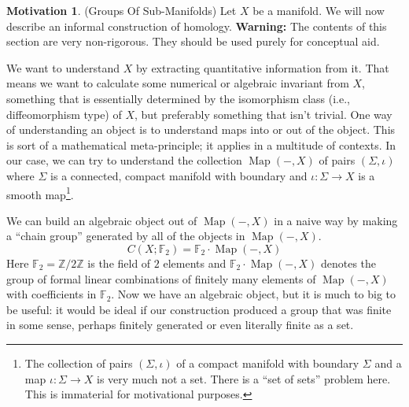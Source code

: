 \documentclass[12pt]{article}
\theoremstyle{definition}
\newtheorem{motivation}[theorem]{Motivation}
\numberwithin{equation}{section}
\newcommand{\Z}{{\mathbb Z}}
\newcommand{\op}{\operatorname}
\begin{document}
\begin{motivation} \label{mot:groups_of_sub_manifolds} (Groups Of Sub-Manifolds) Let $X$ be a manifold. We will now describe an informal construction of homology. {\bf Warning:} The contents of this section are very non-rigorous. They should be used purely for conceptual aid.

We want to understand $X$ by extracting quantitative information from it. That means we want to calculate some numerical or algebraic invariant from $X$, something that is essentially determined by the isomorphism class (i.e., diffeomorphism type) of $X$, but preferably something that isn't trivial. One way of understanding an object is to understand maps into or out of the object. This is sort of a mathematical meta-principle; it applies in a multitude of contexts. In our case, we can try to understand the collection $\op{Map}(-,X)$ of pairs $(\Sigma,\iota)$ where $\Sigma$ is a connected, compact manifold with boundary and $\iota:\Sigma \to X$ is a smooth map\footnote{The collection of pairs $(\Sigma,\iota)$ of a compact manifold with boundary $\Sigma$ and a map $\iota:\Sigma \to X$ is very much not a set. There is a ``set of sets'' problem here. This is immaterial for motivational purposes.}. 

We can build an algebraic object out of $\op{Map}(-,X)$ in a naive way by making a ``chain group'' generated by all of the objects in $\op{Map}(-,X)$.
\[
C(X;\mathbb{F}_2) = \mathbb{F}_2 \cdot \op{Map}(-,X)
\]
Here $\mathbb{F}_2 = \Z/2\Z$ is the field of $2$ elements and $\mathbb{F}_2 \cdot \op{Map}(-,X)$ denotes the group of formal linear combinations of finitely many elements of $\op{Map}(-,X)$ with coefficients in $\mathbb{F}_2$. Now we have an algebraic object, but it is much to big to be useful: it would be ideal if our construction produced a group that was finite in some sense, perhaps finitely generated or even literally finite as a set. 


\end{motivation}
\end{document}
